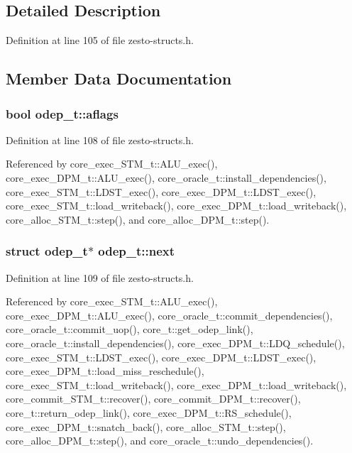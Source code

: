 \subsection{Detailed Description}


Definition at line 105 of file zesto-structs.h.

\subsection{Member Data Documentation}
\subsubsection[{aflags}]{\setlength{\rightskip}{0pt plus 5cm}bool {\bf odep\_\-t::aflags}}\label{structodep__t_1b87d9a262d821eb09ac04a1007a7505}




Definition at line 108 of file zesto-structs.h.

Referenced by core\_\-exec\_\-STM\_\-t::ALU\_\-exec(), core\_\-exec\_\-DPM\_\-t::ALU\_\-exec(), core\_\-oracle\_\-t::install\_\-dependencies(), core\_\-exec\_\-STM\_\-t::LDST\_\-exec(), core\_\-exec\_\-DPM\_\-t::LDST\_\-exec(), core\_\-exec\_\-STM\_\-t::load\_\-writeback(), core\_\-exec\_\-DPM\_\-t::load\_\-writeback(), core\_\-alloc\_\-STM\_\-t::step(), and core\_\-alloc\_\-DPM\_\-t::step().
\subsubsection[{next}]{\setlength{\rightskip}{0pt plus 5cm}struct {\bf odep\_\-t}$\ast$ {\bf odep\_\-t::next}\hspace{0.3cm}{\tt  [read]}}\label{structodep__t_a696a50e030a95db3b98795875dcd908}




Definition at line 109 of file zesto-structs.h.

Referenced by core\_\-exec\_\-STM\_\-t::ALU\_\-exec(), core\_\-exec\_\-DPM\_\-t::ALU\_\-exec(), core\_\-oracle\_\-t::commit\_\-dependencies(), core\_\-oracle\_\-t::commit\_\-uop(), core\_\-t::get\_\-odep\_\-link(), core\_\-oracle\_\-t::install\_\-dependencies(), core\_\-exec\_\-DPM\_\-t::LDQ\_\-schedule(), core\_\-exec\_\-STM\_\-t::LDST\_\-exec(), core\_\-exec\_\-DPM\_\-t::LDST\_\-exec(), core\_\-exec\_\-DPM\_\-t::load\_\-miss\_\-reschedule(), core\_\-exec\_\-STM\_\-t::load\_\-writeback(), core\_\-exec\_\-DPM\_\-t::load\_\-writeback(), core\_\-commit\_\-STM\_\-t::recover(), core\_\-commit\_\-DPM\_\-t::recover(), core\_\-t::return\_\-odep\_\-link(), core\_\-exec\_\-DPM\_\-t::RS\_\-schedule(), core\_\-exec\_\-DPM\_\-t::snatch\_\-back(), core\_\-alloc\_\-STM\_\-t::step(), core\_\-alloc\_\-DPM\_\-t::step(), and core\_\-oracle\_\-t::undo\_\-dependencies().
